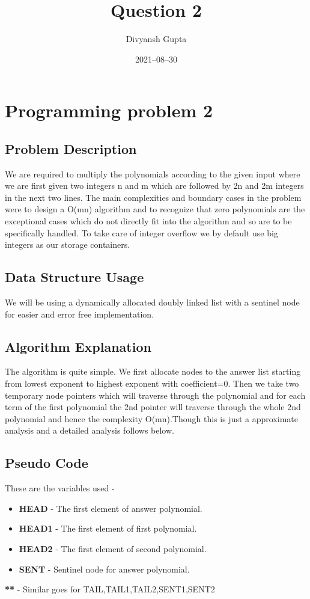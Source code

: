 \documentclass[20pt]{article}
\title{Question 2}
\author{Divyansh Gupta}
\date{2021–08–30}
\begin{document}
\maketitle

\section{Programming problem 2}

\subsection{Problem Description}
We are required to multiply the polynomials according to the given input where we are first given two integers n and m which are followed by {2n} and {2m} integers in the next two lines.
The main complexities and boundary cases in the problem were to design a {O(mn)} algorithm and to recognize that zero polynomials are the exceptional cases which do not directly fit into the algorithm and so are to be specifically handled. To take care of integer overflow we by default use big integers as our storage containers.

\subsection{Data Structure Usage}
We will be using a dynamically allocated doubly linked list with a sentinel node for easier and error free implementation.

\subsection{Algorithm Explanation}
The algorithm is quite simple. We first allocate nodes to the answer list starting from lowest exponent to highest exponent with coefficient=0. Then we take two temporary node pointers which will traverse through the polynomial and for each term of the first polynomial the 2nd pointer will traverse through the whole 2nd polynomial and hence the complexity {O(mn)}.Though this is just a approximate analysis and a detailed analysis follows below.

\subsection{Pseudo Code}
These are the variables used - 

\begin{itemize}
\item \textbf{HEAD}   - The first element of answer polynomial.
\item \textbf{HEAD1} - The first element of first polynomial.
\item \textbf{HEAD2} - The first element of second polynomial.
\item \textbf{SENT}   - Sentinel node for answer polynomial.
\end{itemize}
\textbf{**} - Similar goes for {TAIL,TAIL1,TAIL2,SENT1,SENT2}
\end{document}
